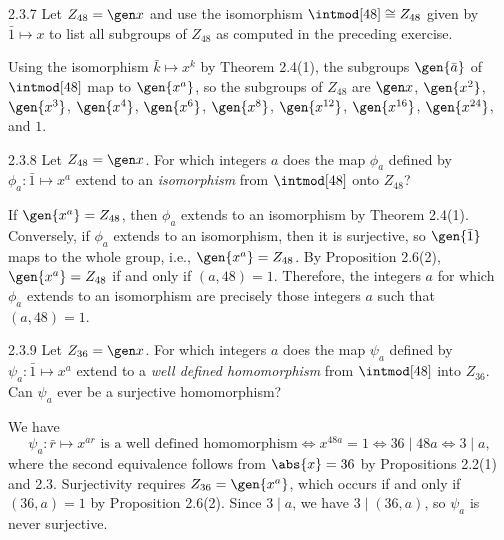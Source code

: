 \begin{exercise}{2.3.7}
    Let $Z_{48} = \gen x$ and use the isomorphism $\intmod[48] \cong Z_{48}$ given by $\bar 1 \mapsto x$ to list all subgroups of $Z_{48}$ as computed in the preceding exercise.
\end{exercise}

\begin{sol}
    Using the isomorphism $\bar k \mapsto x^k$ by Theorem 2.4(1), the subgroups $\gen{\bar a}$ of $\intmod[48]$ map to $\gen{x^a}$, so the subgroups of $Z_{48}$ are $\gen x$, $\gen{x^2}$, $\gen {x^3}$, $\gen{x^4}$, $\gen{x^6}$, $\gen{x^8}$, $\gen{x^{12}}$, $\gen{x^{16}}$, $\gen{x^{24}}$, and $1$.
\end{sol}

\begin{exercise}{2.3.8}
    Let $Z_{48} = \gen x$.
	For which integers $a$ does the map $\phi_a$ defined by $\phi_a \colon \bar 1 \mapsto x^a$ extend to an \emph{isomorphism} from $\intmod[48]$ onto $Z_{48}$?
\end{exercise}

\begin{sol}
    If $\gen{x^a} = Z_{48}$, then $\phi_a$ extends to an isomorphism by Theorem 2.4(1).
    Conversely, if $\phi_a$ extends to an isomorphism, then it is surjective, so $\gen{\bar 1}$ maps to the whole group, i.e., $\gen{x^a} = Z_{48}$.
    By Proposition 2.6(2), $\gen{x^a} = Z_{48}$ if and only if $(a, 48) = 1$.
    Therefore, the integers $a$ for which $\phi_a$ extends to an isomorphism are precisely those integers $a$ such that $(a, 48) = 1$.
\end{sol}

\begin{exercise}{2.3.9}
    Let $Z_{36} = \gen x$.
	For which integers $a$ does the map $\psi_a$ defined by $\psi_a \colon \bar 1 \mapsto x^a$ extend to a \emph{well defined homomorphism} from $\intmod[48]$ into $Z_{36}$.
	Can $\psi_a$ ever be a surjective homomorphism?
\end{exercise}

\begin{sol}
    We have
    \[
        \psi_a \colon \bar r \mapsto x^{ar} \text{ is a well defined homomorphism} \iff x^{48a} = 1 \iff 36 \mid 48a \iff 3 \mid a,
    \]
    where the second equivalence follows from $\abs{x} = 36$ by Propositions 2.2(1) and 2.3.
    Surjectivity requires $Z_{36} = \gen{x^a}$, which occurs if and only if $(36, a) = 1$ by Proposition 2.6(2).
    Since $3 \mid a$, we have $3 \mid (36, a)$, so $\psi_a$ is never surjective.
\end{sol}

